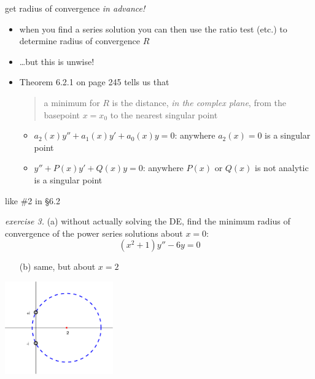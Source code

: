 \documentclass[urlcolor=blue,dvipsnames]{beamer}
\begin{document}
\begin{frame}{get radius of convergence \emph{in advance!}}

\begin{itemize}
\item when you find a series solution you can then use the ratio test (etc.) to determine radius of convergence $R$
\item \dots but this is unwise!
\item Theorem 6.2.1 on page 245 tells us that

\medskip
\begin{quote}
\normalfont \alert{a minimum for $R$ is the distance, \emph{in the complex plane}, from the basepoint $x=x_0$ to the nearest singular point}
\end{quote}

    \begin{itemize}
    \item $a_2(x) y''+ a_1(x) y' + a_0(x) y=0$: anywhere $a_2(x)=0$ is a singular point
    \item $y''+P(x)y'+Q(x)y=0$: anywhere $P(x)$ or $Q(x)$ is not analytic is a singular point
    \end{itemize}
\end{itemize}
\end{frame}


\begin{frame}{like \#2 in \S 6.2}

\noindent \emph{exercise 3.}  {\color{Blue} (a)} without actually solving the DE, find the minimum radius of convergence of the power series solutions about $x=0$:
  $$(x^2+1) y'' - 6 y = 0$$

\vspace{15mm}
\begin{itemize}
\item[(b)] same, but about $x=2$
\end{itemize}

\hfill \includegraphics[width=0.35\textwidth]{figs/minradius}
\end{frame}
\end{document}
